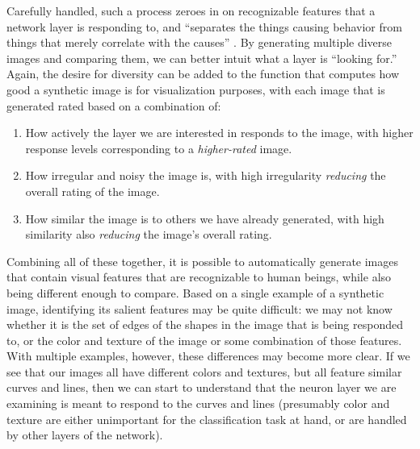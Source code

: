 \documentclass[leqno,12pt]{article}
\begin{document}
Carefully handled, such a process zeroes in on recognizable features that a network layer is responding to, and
``separates the things causing behavior from things that merely correlate with the causes'' \cite{Olah17}. By
generating multiple diverse images and comparing them, we can better intuit what a layer is ``looking for.''
Again, the desire for diversity can be added to the function that computes how good a synthetic image is for
visualization purposes, with each image that is generated rated based on a combination of:
\begin{enumerate} \cutwspace
	\item How actively the layer we are interested in responds to the image, with higher response levels
		corresponding to a \emph{higher-rated} image.
	\item How irregular and noisy the image is, with high irregularity \emph{reducing} the overall
		rating of the image.
	\item How similar the image is to others we have already generated, with high similarity also
		\emph{reducing} the image's overall rating.
\end{enumerate}
Combining all of these together, it is possible to automatically generate images that contain visual features
that are recognizable to human beings, while also being different enough to compare.  Based on a single example
of a synthetic image, identifying its salient features may be quite difficult:  we may not know whether it is
the set of edges of the shapes in the image that is being responded to, or the color and texture of the image or
some combination of those features.  With multiple examples, however, these differences may become more clear.
If we see that our images all have different colors and textures, but all feature similar curves and lines, then
we can start to understand that the neuron layer we are examining is meant to respond to the curves and lines
(presumably color and texture are either unimportant for the classification task at hand, or are handled by
other layers of the network).
\end{document}
